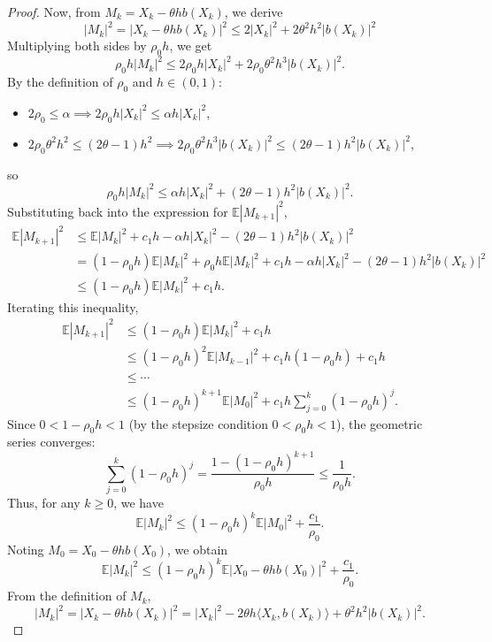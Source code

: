 \documentclass{article}
\begin{document}
\begin{proof}
Now, from $ M_k = X_k - \theta h b(X_k) $, we derive  
\[
|M_k|^2 = |X_k - \theta h b(X_k)|^2 \leq 2|X_k|^2 + 2\theta^2 h^2 |b(X_k)|^2 
\]  
Multiplying both sides by $ \rho_0 h $, we get  
\[
\rho_0 h |M_k|^2 \leq 2\rho_0 h |X_k|^2 + 2\rho_0 \theta^2 h^3 |b(X_k)|^2.
\]  
By the definition of $ \rho_0 $ and $h\in(0,1)$:  
\begin{itemize}
	\item $ 2\rho_0 \leq \alpha \implies 2\rho_0 h |X_k|^2 \leq \alpha h |X_k|^2 $,  
	\item $ 2\rho_0 \theta^2 h^2 \leq (2\theta - 1)h^2 \implies 2\rho_0 \theta^2 h^3 |b(X_k)|^2 \leq (2\theta - 1)h^2 |b(X_k)|^2 $,  
\end{itemize}
so  
\[
\rho_0 h |M_k|^2 \leq \alpha h |X_k|^2 + (2\theta - 1)h^2 |b(X_k)|^2.
\]  
Substituting back into the expression for $ \mathbb{E}|M_{k+1}|^2 $,  
\[
\begin{aligned}
	\mathbb{E}|M_{k+1}|^2 &\leq \mathbb{E}|M_k|^2 + c_1 h - \alpha h |X_k|^2 - (2\theta - 1)h^2 |b(X_k)|^2 \\
	&= (1-\rho_0 h)\mathbb{E}|M_k|^2 + \rho_0 h\mathbb{E}|M_k|^2 + c_1 h - \alpha h |X_k|^2 - (2\theta - 1)h^2 |b(X_k)|^2\ \\
	&\leq (1 - \rho_0 h) \mathbb{E}|M_k|^2 + c_1 h.
\end{aligned}
\]  
Iterating this inequality,  
\[
\begin{aligned}
	\mathbb{E}|M_{k+1}|^2 &\leq (1 - \rho_0 h) \mathbb{E}|M_k|^2 + c_1 h \\
	&\leq (1 - \rho_0 h)^2 \mathbb{E}|M_{k-1}|^2 + c_1 h (1 - \rho_0 h) + c_1 h \\
	&\leq \cdots \\
	&\leq (1 - \rho_0 h)^{k+1} \mathbb{E}|M_0|^2 + c_1 h \sum_{j=0}^k (1 - \rho_0 h)^j.
\end{aligned}
\]  
Since $ 0 < 1 - \rho_0 h < 1 $ (by the stepsize condition $ 0 < \rho_0 h < 1 $), the geometric series converges:  
\[
\sum_{j=0}^k (1 - \rho_0 h)^j = \frac{1 - (1 - \rho_0 h)^{k+1}}{\rho_0 h} \leq \frac{1}{\rho_0 h}.
\]  
Thus, for any $k \geq 0$, we have  
\[
\mathbb{E}|M_k|^2 \leq (1 - \rho_0 h)^k \mathbb{E}|M_0|^2 + \frac{c_1}{\rho_0}.
\]  
Noting $ M_0 = X_0 - \theta h b(X_0) $, we obtain  
\[
\mathbb{E}|M_k|^2 \leq (1 - \rho_0 h)^k \mathbb{E}|X_0 - \theta h b(X_0)|^2 + \frac{c_1}{\rho_0}.
\]  
From the definition of $ M_k $,  
\[
|M_k|^2 = |X_k - \theta h b(X_k)|^2 = |X_k|^2 - 2\theta h \langle X_k, b(X_k) \rangle + \theta^2 h^2 |b(X_k)|^2.
\]
\end{proof}
\end{document}
